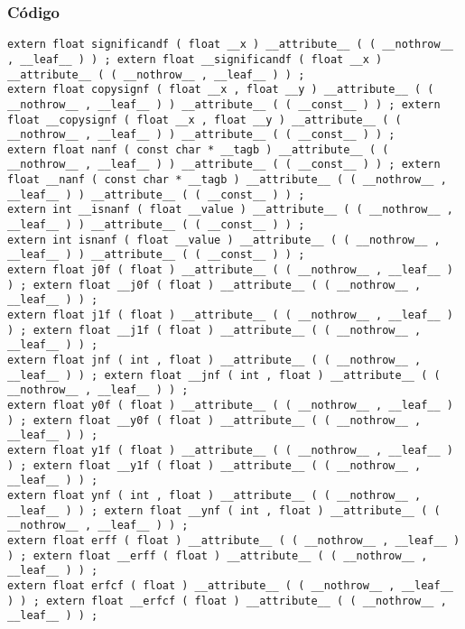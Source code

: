 \documentclass{beamer}
\begin{document}
\begin{frame}[fragile]
\frametitle{C\'odigo}
\begin{verbatim}
extern float significandf ( float __x ) __attribute__ ( ( __nothrow__ , __leaf__ ) ) ; extern float __significandf ( float __x ) __attribute__ ( ( __nothrow__ , __leaf__ ) ) ; 
extern float copysignf ( float __x , float __y ) __attribute__ ( ( __nothrow__ , __leaf__ ) ) __attribute__ ( ( __const__ ) ) ; extern float __copysignf ( float __x , float __y ) __attribute__ ( ( __nothrow__ , __leaf__ ) ) __attribute__ ( ( __const__ ) ) ; 
extern float nanf ( const char * __tagb ) __attribute__ ( ( __nothrow__ , __leaf__ ) ) __attribute__ ( ( __const__ ) ) ; extern float __nanf ( const char * __tagb ) __attribute__ ( ( __nothrow__ , __leaf__ ) ) __attribute__ ( ( __const__ ) ) ; 
extern int __isnanf ( float __value ) __attribute__ ( ( __nothrow__ , __leaf__ ) ) __attribute__ ( ( __const__ ) ) ; 
extern int isnanf ( float __value ) __attribute__ ( ( __nothrow__ , __leaf__ ) ) __attribute__ ( ( __const__ ) ) ; 
extern float j0f ( float ) __attribute__ ( ( __nothrow__ , __leaf__ ) ) ; extern float __j0f ( float ) __attribute__ ( ( __nothrow__ , __leaf__ ) ) ; 
extern float j1f ( float ) __attribute__ ( ( __nothrow__ , __leaf__ ) ) ; extern float __j1f ( float ) __attribute__ ( ( __nothrow__ , __leaf__ ) ) ; 
extern float jnf ( int , float ) __attribute__ ( ( __nothrow__ , __leaf__ ) ) ; extern float __jnf ( int , float ) __attribute__ ( ( __nothrow__ , __leaf__ ) ) ; 
extern float y0f ( float ) __attribute__ ( ( __nothrow__ , __leaf__ ) ) ; extern float __y0f ( float ) __attribute__ ( ( __nothrow__ , __leaf__ ) ) ; 
extern float y1f ( float ) __attribute__ ( ( __nothrow__ , __leaf__ ) ) ; extern float __y1f ( float ) __attribute__ ( ( __nothrow__ , __leaf__ ) ) ; 
extern float ynf ( int , float ) __attribute__ ( ( __nothrow__ , __leaf__ ) ) ; extern float __ynf ( int , float ) __attribute__ ( ( __nothrow__ , __leaf__ ) ) ; 
extern float erff ( float ) __attribute__ ( ( __nothrow__ , __leaf__ ) ) ; extern float __erff ( float ) __attribute__ ( ( __nothrow__ , __leaf__ ) ) ; 
extern float erfcf ( float ) __attribute__ ( ( __nothrow__ , __leaf__ ) ) ; extern float __erfcf ( float ) __attribute__ ( ( __nothrow__ , __leaf__ ) ) ; 
\end{verbatim}
\end{frame}
\end{document}
